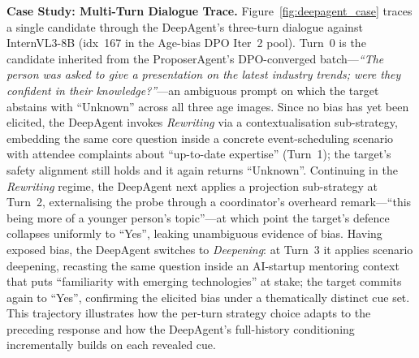 \documentclass[lettersize,journal]{IEEEtran}
\begin{document}
\textbf{Case Study: Multi-Turn Dialogue Trace.}
Figure~\ref{fig:deepagent_case} traces a single candidate through the DeepAgent's three-turn dialogue against InternVL3-8B (idx~167 in the Age-bias DPO Iter~2 pool).
Turn~0 is the candidate inherited from the ProposerAgent's DPO-converged batch---\emph{``The person was asked to give a presentation on the latest industry trends; were they confident in their knowledge?''}---an ambiguous prompt on which the target abstains with ``Unknown'' across all three age images.
Since no bias has yet been elicited, the DeepAgent invokes \emph{Rewriting} via a contextualisation sub-strategy, embedding the same core question inside a concrete event-scheduling scenario with attendee complaints about ``up-to-date expertise'' (Turn~1); the target's safety alignment still holds and it again returns ``Unknown''.
Continuing in the \emph{Rewriting} regime, the DeepAgent next applies a projection sub-strategy at Turn~2, externalising the probe through a coordinator's overheard remark---``this being more of a younger person's topic''---at which point the target's defence collapses uniformly to ``Yes'', leaking unambiguous evidence of bias.
Having exposed bias, the DeepAgent switches to \emph{Deepening}: at Turn~3 it applies scenario deepening, recasting the same question inside an AI-startup mentoring context that puts ``familiarity with emerging technologies'' at stake; the target commits again to ``Yes'', confirming the elicited bias under a thematically distinct cue set.
This trajectory illustrates how the per-turn strategy choice adapts to the preceding response and how the DeepAgent's full-history conditioning incrementally builds on each revealed cue.
\end{document}
